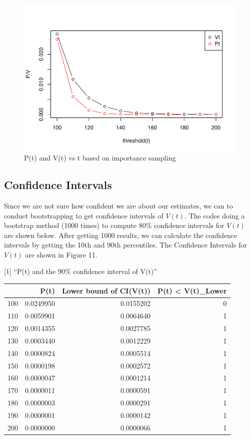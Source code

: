 \documentclass[11pt,]{article}
\begin{document}
\begin{figure}
\centering
\includegraphics{figs/unnamed-chunk-25.pdf}
\caption{P(t) and V(t) vs t based on importance sampling}
\end{figure}

\hypertarget{confidence-intervals}{%
\subsection{Confidence Intervals}\label{confidence-intervals}}

Since we are not sure how confident we are about our estimates, we can
to conduct bootstrapping to get confidence intervals of \(V(t)\). The
codes doing a bootstrap method (1000 times) to compute 80\% confidence
intervals for \(V(t)\) are shown below. After getting 1000 results, we
can calculate the confidence intervals by getting the 10th and 90th
percentiles. The Confidence Intervals for \(V(t)\) are shown in Figure
11.

{[}1{]} ``P(t) and the 90\% confidence interval of V(t)''

\begin{longtable}[]{@{}lrrr@{}}
\toprule
& P(t) & Lower bound of CI(V(t)) & P(t) \textless{}
V(t)\_Lower\tabularnewline
\midrule
\endhead
100 & 0.0249950 & 0.0155202 & 0\tabularnewline
110 & 0.0059901 & 0.0064640 & 1\tabularnewline
120 & 0.0014355 & 0.0027785 & 1\tabularnewline
130 & 0.0003440 & 0.0012229 & 1\tabularnewline
140 & 0.0000824 & 0.0005514 & 1\tabularnewline
150 & 0.0000198 & 0.0002572 & 1\tabularnewline
160 & 0.0000047 & 0.0001214 & 1\tabularnewline
170 & 0.0000011 & 0.0000591 & 1\tabularnewline
180 & 0.0000003 & 0.0000291 & 1\tabularnewline
190 & 0.0000001 & 0.0000142 & 1\tabularnewline
200 & 0.0000000 & 0.0000066 & 1\tabularnewline
\bottomrule
\end{longtable}
\end{document}
